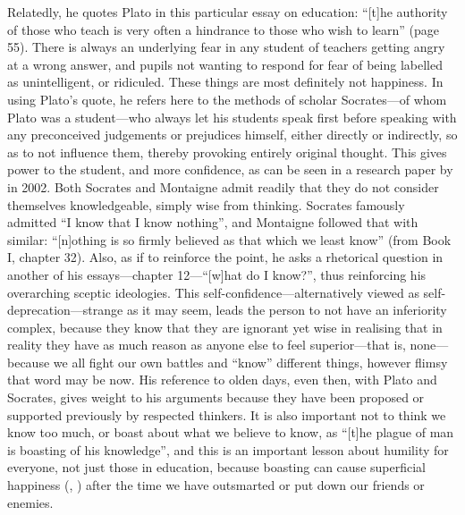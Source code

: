 \documentclass[12pt,a4paper]{article}
\begin{document}
Relatedly, he quotes Plato in this particular essay on education:
``[t]he authority of those who teach is very often a hindrance to
those who wish to learn'' (page 55). There is always an underlying
fear in any student of teachers getting angry at a wrong answer, and
pupils not wanting to respond for fear of being labelled as
unintelligent, or ridiculed. These things are most definitely not
happiness. In using Plato's quote, he refers here to the methods of
scholar Socrates---of whom Plato was a student---who always let his
students speak first before speaking with any preconceived judgements
or prejudices himself, either directly or indirectly, so as to not
influence them, thereby provoking entirely original thought. This
gives power to the student, and more confidence, as can be seen in a
research paper by \citeauthor{holden2002inquiry} in 2002. Both
Socrates and Montaigne admit readily that they do not consider
themselves knowledgeable, simply wise from thinking. Socrates famously
admitted ``I know that I know nothing'', and Montaigne followed that
with similar: ``[n]othing is so firmly believed as that which we least
know'' (from Book I, chapter 32). Also, as if to reinforce the point,
he asks a rhetorical question in another of his essays---chapter
12---``[w]hat do I know?'', thus reinforcing his overarching sceptic
ideologies. This self-confidence---alternatively viewed as
self-deprecation---strange as it may seem, leads the person to not
have an inferiority complex, because they know that they are ignorant
yet wise in realising that in reality they have as much reason as
anyone else to feel superior---that is, none---because we all fight
our own battles and ``know'' different things, however flimsy that
word may be now. His reference to olden days, even then, with Plato
and Socrates, gives weight to his arguments because they have been
proposed or supported previously by respected thinkers. It is also
important not to think we know too much, or boast about what we
believe to know, as ``[t]he plague of man is boasting of his
knowledge'', and this is an important lesson about humility for
everyone, not just those in education, because boasting can cause
superficial happiness (\citeauthor{khattak2014morality},
\citeyear{khattak2014morality}) after the time we have outsmarted or
put down our friends or enemies.\\\\
\end{document}
